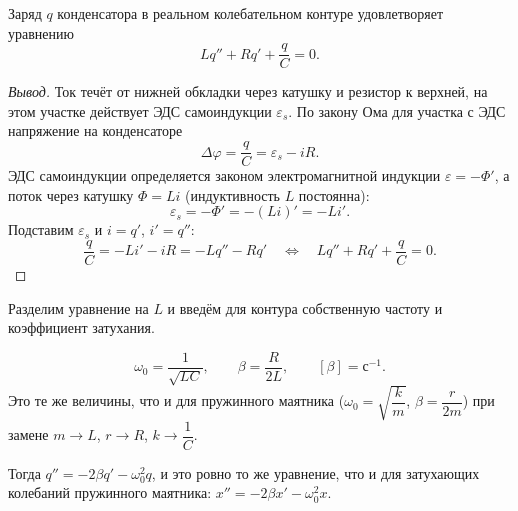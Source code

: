 \documentclass[12pt]{article}
\begin{document}
	\begin{statement}
		Заряд $q$ конденсатора в реальном колебательном контуре удовлетворяет уравнению
		\[
			Lq'' + Rq' + \dfrac{q}{C} = 0.
		\]
	\end{statement}
	\begin{proof}[Вывод]
		Ток течёт от нижней обкладки через катушку и резистор к верхней, на этом участке действует ЭДС самоиндукции $\varepsilon_s$. По закону Ома для участка с ЭДС напряжение на конденсаторе
		\[
			\varDelta \varphi = \dfrac{q}{C} = \varepsilon_s - iR.
		\]
		ЭДС самоиндукции определяется законом электромагнитной индукции $\varepsilon = -\Phi'$, а поток через катушку $\Phi = Li$ (индуктивность $L$ постоянна):
		\[
			\varepsilon_s = -\Phi' = -(Li)' = -Li'.
		\]
		Подставим $\varepsilon_s$ и $i = q'$, $i' = q''$:
		\[
			\dfrac{q}{C} = -Li' - iR = -Lq'' - Rq' \quad \Longleftrightarrow \quad Lq'' + Rq' + \dfrac{q}{C} = 0.
		\]
	\end{proof}
	
	Разделим уравнение на $L$ и введём для контура собственную частоту и коэффициент затухания.
	
	\begin{definition}
		\[
			\omega_0 = \dfrac{1}{\sqrt{LC}}, \qquad \beta = \dfrac{R}{2L}, \qquad [\beta] = \text{с}^{-1}.
		\]
		Это те же величины, что и для пружинного маятника ($\omega_0 = \sqrt{\dfrac{k}{m}}$, $\beta = \dfrac{r}{2m}$) при замене $m \to L$, $r \to R$, $k \to \dfrac{1}{C}$.
	\end{definition}
	
	Тогда $q'' = -2\beta q' - \omega_0^2 q$, и это ровно то же уравнение, что и для затухающих колебаний пружинного маятника: $x'' = -2\beta x' - \omega_0^2 x$.
	
\end{document}

